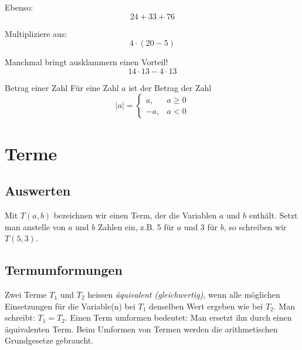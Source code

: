 \begin{example}
Ebenso:
\[
	24+33+76
\]
\end{example}

\begin{example}
Multipliziere aus:
\[
	4\cdot (20-5)
\]
\end{example}

\begin{example}
Manchmal bringt ausklammern einen Vorteil!
\[
	14\cdot 13 - 4\cdot 13
\]
\end{example}

\begin{defn}{Betrag einer Zahl}
		Für eine Zahl $a$ ist der Betrag der Zahl
		\[
			|a|=\left\{\begin{array}{ll} a, & a\ge 0 \\
         -a, & a<0\end{array}\right.
		\]
\end{defn}


\section{Terme}
\subsection*{Auswerten}
Mit $T(a,b)$ bezeichnen wir einen Term, der die Variablen $a$ und $b$ enthält. Setzt man anstelle von $a$ und $b$ Zahlen ein, z.B. 5 für $a$ und 3 für $b$, so schreiben wir $T(5,3)$.
\vspace{1cm}

\subsection*{Termumformungen}
Zwei Terme $T_1$ und $T_2$ heissen \emph{äquivalent (gleichwertig)}, wenn alle möglichen Einsetzungen für die Variable(n) bei $T_1$ denselben Wert ergeben wie bei $T_2$.
Man schreibt: $T_1 = T_2$.
\vspace{5mm}
Einen Term umformen bedeutet:
Man ersetzt ihn durch einen äquivalenten Term. Beim Umformen von Termen werden die arithmetischen Grundgesetze gebraucht.

